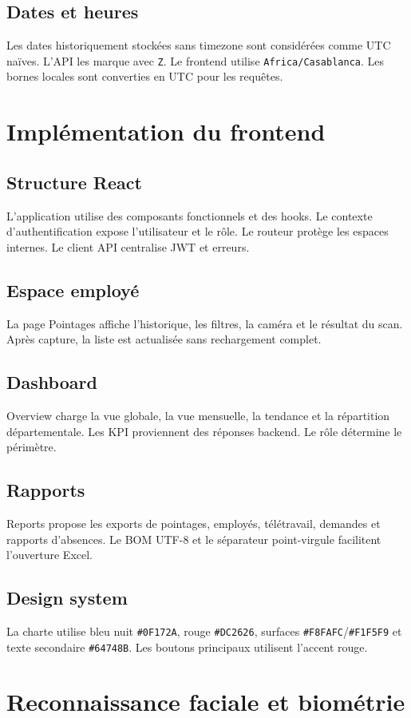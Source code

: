 \documentclass[11pt,a4paper,oneside]{report}
\begin{document}
\section{Dates et heures}
Les dates historiquement stockées sans timezone sont considérées comme UTC naïves. L'API les marque avec \texttt{Z}. Le frontend utilise \texttt{Africa/Casablanca}. Les bornes locales sont converties en UTC pour les requêtes.

\chapter{Implémentation du frontend}
\section{Structure React}
L'application utilise des composants fonctionnels et des hooks. Le contexte d'authentification expose l'utilisateur et le rôle. Le routeur protège les espaces internes. Le client API centralise JWT et erreurs.
\section{Espace employé}
La page Pointages affiche l'historique, les filtres, la caméra et le résultat du scan. Après capture, la liste est actualisée sans rechargement complet.
\section{Dashboard}
Overview charge la vue globale, la vue mensuelle, la tendance et la répartition départementale. Les KPI proviennent des réponses backend. Le rôle détermine le périmètre.
\section{Rapports}
Reports propose les exports de pointages, employés, télétravail, demandes et rapports d'absences. Le BOM UTF-8 et le séparateur point-virgule facilitent l'ouverture Excel.
\section{Design system}
La charte utilise bleu nuit \texttt{\#0F172A}, rouge \texttt{\#DC2626}, surfaces \texttt{\#F8FAFC}/\texttt{\#F1F5F9} et texte secondaire \texttt{\#64748B}. Les boutons principaux utilisent l'accent rouge.

\chapter{Reconnaissance faciale et biométrie}
\end{document}
